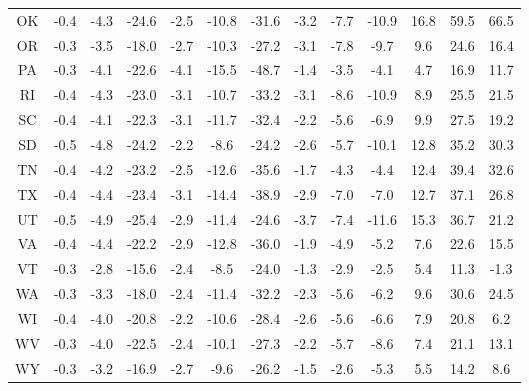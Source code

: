 \begin{table}
\begin{tabular}{ccccccccccccc}
   OK & -0.4 & -4.3 & -24.6 & -2.5 & -10.8 &  -31.6 & -3.2 &  -7.7 & -10.9 & 16.8 & 59.5 & 66.5 \\
   OR & -0.3 & -3.5 & -18.0 & -2.7 & -10.3 &  -27.2 & -3.1 &  -7.8 &  -9.7 &  9.6 & 24.6 & 16.4 \\
   PA & -0.3 & -4.1 & -22.6 & -4.1 & -15.5 &  -48.7 & -1.4 &  -3.5 &  -4.1 &  4.7 & 16.9 & 11.7 \\
   RI & -0.4 & -4.3 & -23.0 & -3.1 & -10.7 &  -33.2 & -3.1 &  -8.6 & -10.9 &  8.9 & 25.5 & 21.5 \\
   SC & -0.4 & -4.1 & -22.3 & -3.1 & -11.7 &  -32.4 & -2.2 &  -5.6 &  -6.9 &  9.9 & 27.5 & 19.2 \\
   SD & -0.5 & -4.8 & -24.2 & -2.2 &  -8.6 &  -24.2 & -2.6 &  -5.7 & -10.1 & 12.8 & 35.2 & 30.3 \\
   TN & -0.4 & -4.2 & -23.2 & -2.5 & -12.6 &  -35.6 & -1.7 &  -4.3 &  -4.4 & 12.4 & 39.4 & 32.6 \\
   TX & -0.4 & -4.4 & -23.4 & -3.1 & -14.4 &  -38.9 & -2.9 &  -7.0 &  -7.0 & 12.7 & 37.1 & 26.8 \\
   UT & -0.5 & -4.9 & -25.4 & -2.9 & -11.4 &  -24.6 & -3.7 &  -7.4 & -11.6 & 15.3 & 36.7 & 21.2 \\
   VA & -0.4 & -4.4 & -22.2 & -2.9 & -12.8 &  -36.0 & -1.9 &  -4.9 &  -5.2 &  7.6 & 22.6 & 15.5 \\
   VT & -0.3 & -2.8 & -15.6 & -2.4 &  -8.5 &  -24.0 & -1.3 &  -2.9 &  -2.5 &  5.4 & 11.3 & -1.3 \\
   WA & -0.3 & -3.3 & -18.0 & -2.4 & -11.4 &  -32.2 & -2.3 &  -5.6 &  -6.2 &  9.6 & 30.6 & 24.5 \\
   WI & -0.4 & -4.0 & -20.8 & -2.2 & -10.6 &  -28.4 & -2.6 &  -5.6 &  -6.6 &  7.9 & 20.8 &  6.2 \\
   WV & -0.3 & -4.0 & -22.5 & -2.4 & -10.1 &  -27.3 & -2.2 &  -5.7 &  -8.6 &  7.4 & 21.1 & 13.1 \\
   WY & -0.3 & -3.2 & -16.9 & -2.7 &  -9.6 &  -26.2 & -1.5 &  -2.6 &  -5.3 &  5.5 & 14.2 &  8.6 \\
\bottomrule
\end{tabular}
\end{table}
